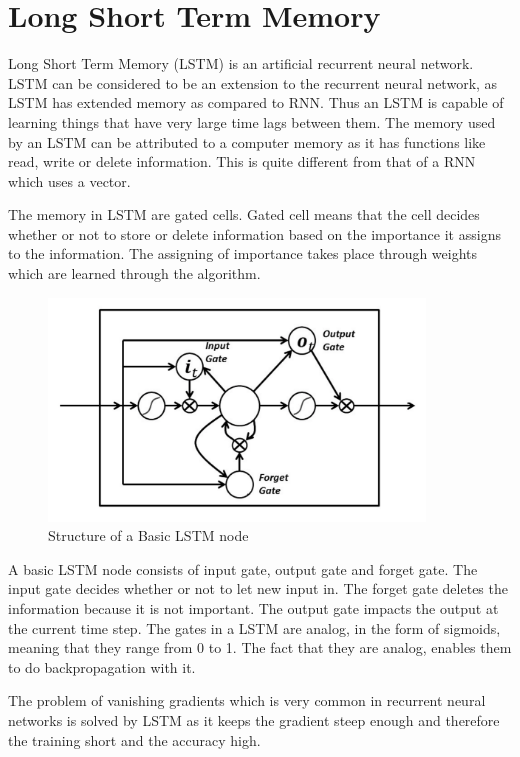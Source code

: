 \section{Long Short Term Memory}

Long Short Term Memory (LSTM) is an artificial recurrent neural network.
LSTM can be considered to be an extension to the recurrent neural network, as LSTM has extended memory as compared to RNN. Thus an LSTM is capable of learning things that have very
large time lags between them. The memory used by an LSTM can be attributed to a computer memory as it has functions like read, write or delete information. This is quite different from that of a RNN which uses a vector. 

The memory in LSTM are gated cells. Gated cell means that the cell decides
whether or not to store or delete information based on the importance it assigns
to the information. The assigning of importance takes place through weights which
are learned through the algorithm.

\begin{figure}
	\caption{Structure of a Basic LSTM node}
	\centering\includegraphics[width=10cm]{4.png}
\end{figure}

A basic LSTM node consists of input gate, output gate and forget gate. The input
gate decides whether or not to let new input in. The forget gate deletes the
information because it is not important. The output gate impacts the output at
the current time step. The gates in a LSTM are analog, in the form of sigmoids,
meaning that they range from 0 to 1. The fact that they are analog, enables them
to do backpropagation with it.

The problem of vanishing gradients which is very common in recurrent neural
networks is solved by LSTM as it keeps the gradient steep enough and therefore
the training short and the accuracy high.
